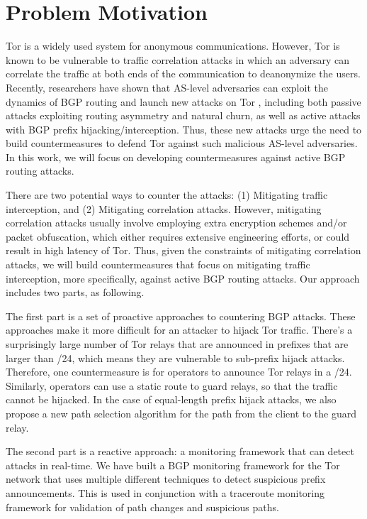 \section{Problem Motivation}

Tor is a widely used system for anonymous communications. However, Tor is known to be vulnerable to traffic correlation attacks in which an adversary can correlate the traffic at both ends of the communication to deanonymize the users. Recently, researchers have shown that AS-level adversaries can exploit the dynamics of BGP routing and launch new attacks on Tor \cite{sun2015raptor}, including both passive attacks exploiting routing asymmetry and natural churn, as well as active attacks with BGP prefix hijacking/interception. Thus, these new attacks urge the need to build countermeasures to defend Tor against such malicious AS-level adversaries. In this work, we will focus on developing countermeasures against active BGP routing attacks. 

There are two potential ways to counter the attacks: (1) Mitigating traffic interception, and (2) Mitigating correlation attacks. However, mitigating correlation attacks usually involve employing extra encryption schemes and/or packet obfuscation, which either requires extensive engineering efforts, or could result in high latency of Tor. Thus, given the constraints of mitigating correlation attacks, we will build countermeasures that focus on mitigating traffic interception, more specifically, against active BGP routing attacks. Our approach includes two parts, as following. 

The first part is a set of proactive approaches to countering BGP attacks.  These approaches make it more difficult for an attacker to hijack Tor traffic.  There's a surprisingly large number  of Tor relays that are announced in prefixes that are larger than /24, which means they are vulnerable to sub-prefix hijack attacks.  Therefore, one countermeasure is for operators to announce Tor relays in a /24.  Similarly, operators can use a static route to guard relays, so that the traffic cannot be hijacked.  In the case of equal-length prefix hijack attacks, we also propose a new path selection algorithm for the path from the client to the guard relay.  

The second part is a reactive approach: a monitoring framework that can detect attacks in real-time.  We have built a BGP monitoring framework for the Tor network that uses multiple different techniques to detect suspicious prefix announcements.  This is used in conjunction with a traceroute monitoring framework for validation of path changes and suspicious paths.  


